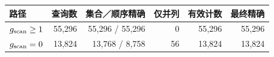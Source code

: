 \begin{tabular}{@{}lrrrrr@{}}
\toprule
路径 & 查询数 & 集合／顺序精确 & 仅并列 & 有效计数 & 最终精确 \\
\midrule
$g_{\mathrm{scan}}\geq1$ & 55,296 & 55,296 / 55,296 & 0 & 55,296 & 55,296 \\
$g_{\mathrm{scan}}=0$ & 13,824 & 13,768 / 8,758 & 56 & 13,824 & 13,824 \\
\bottomrule
\end{tabular}
